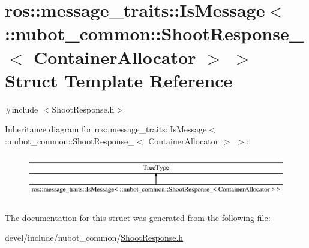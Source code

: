 \hypertarget{structros_1_1message__traits_1_1IsMessage_3_01_1_1nubot__common_1_1ShootResponse___3_01ContainerAllocator_01_4_01_4}{\section{ros\-:\-:message\-\_\-traits\-:\-:Is\-Message$<$ \-:\-:nubot\-\_\-common\-:\-:Shoot\-Response\-\_\-$<$ Container\-Allocator $>$ $>$ Struct Template Reference}
\label{structros_1_1message__traits_1_1IsMessage_3_01_1_1nubot__common_1_1ShootResponse___3_01ContainerAllocator_01_4_01_4}
}


{\ttfamily \#include $<$Shoot\-Response.\-h$>$}

Inheritance diagram for ros\-:\-:message\-\_\-traits\-:\-:Is\-Message$<$ \-:\-:nubot\-\_\-common\-:\-:Shoot\-Response\-\_\-$<$ Container\-Allocator $>$ $>$\-:\begin{figure}[H]
\begin{center}
\leavevmode
\includegraphics[height=2.000000cm]{structros_1_1message__traits_1_1IsMessage_3_01_1_1nubot__common_1_1ShootResponse___3_01ContainerAllocator_01_4_01_4}
\end{center}
\end{figure}


The documentation for this struct was generated from the following file\-:\begin{DoxyCompactItemize}
\item 
devel/include/nubot\-\_\-common/\hyperlink{ShootResponse_8h}{Shoot\-Response.\-h}\end{DoxyCompactItemize}
